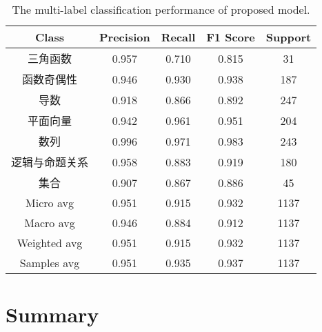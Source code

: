 \begin{table}[htbp!]
    \caption{The multi-label classification performance of proposed model.}\label{tbl:ch2-result-detail}
    \centering
    \begin{tabular}{ccccc}
        \toprule
        Class          & Precision & Recall & F1 Score & Support \\
        \midrule
        三角函数       & 0.957     & 0.710  & 0.815    & 31      \\
        函数奇偶性     & 0.946     & 0.930  & 0.938    & 187     \\
        导数           & 0.918     & 0.866  & 0.892    & 247     \\
        平面向量       & 0.942     & 0.961  & 0.951    & 204     \\
        数列           & 0.996     & 0.971  & 0.983    & 243     \\
        逻辑与命题关系 & 0.958     & 0.883  & 0.919    & 180     \\
        集合           & 0.907     & 0.867  & 0.886    & 45      \\
        \midrule
        Micro avg      & 0.951     & 0.915  & 0.932    & 1137    \\
        Macro avg      & 0.946     & 0.884  & 0.912    & 1137    \\
        Weighted avg   & 0.951     & 0.915  & 0.932    & 1137    \\
        Samples avg    & 0.951     & 0.935  & 0.937    & 1137    \\
        \bottomrule
    \end{tabular}
\end{table}

\section{Summary}


